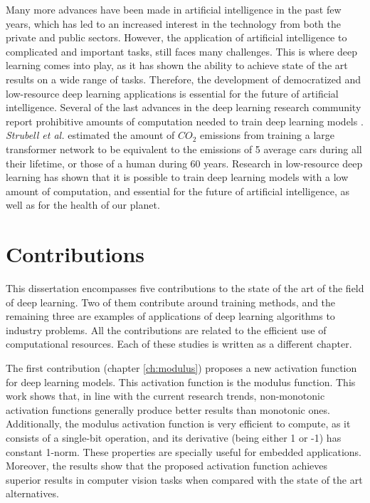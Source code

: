 Many more advances have been made in artificial intelligence in the past few years, which has led to an increased interest in the technology from both the private and public sectors. However, the application of artificial intelligence to complicated and important tasks, still faces many challenges. This is where deep learning comes into play, as it has shown the ability to achieve state of the art results on a wide range of tasks. Therefore, the development of democratized and low-resource deep learning applications is essential for the future of artificial intelligence. Several of the last advances in the deep learning research community report prohibitive amounts of computation needed to train deep learning models \autocite{silver2016, kechyn2018, brown2020, floridi2020}. \textit{Strubell et al.} \autocite{strubell2019} estimated the amount of $CO_2$ emissions from training a large transformer network to be equivalent to the emissions of 5 average cars during all their lifetime, or those of a human during 60 years. Research in low-resource deep learning \autocite{howard2017, Han2017, Gao2018, sanchez2020, so2021} has shown that it is possible to train deep learning models with a low amount of computation, and essential for the future of artificial intelligence, as well as for the health of our planet.


\section{Contributions}
This dissertation encompasses five contributions to the state of the art of the field of deep learning. Two of them contribute around training methods, and the remaining three are examples of applications of deep learning algorithms to industry problems. All the contributions are related to the efficient use of computational resources. Each of these studies is written as a different chapter.

The first contribution (chapter \ref{ch:modulus}) proposes a new activation function for deep learning models. This activation function is the modulus function. This work shows that, in line with the current research trends, non-monotonic activation functions generally produce better results than monotonic ones. Additionally, the modulus activation function is very efficient to compute, as it consists of a single-bit operation, and its derivative (being either 1 or -1) has constant 1-norm. These properties are specially useful for embedded applications. Moreover, the results show that the proposed activation function achieves superior results in computer vision tasks when compared with the state of the art alternatives.

